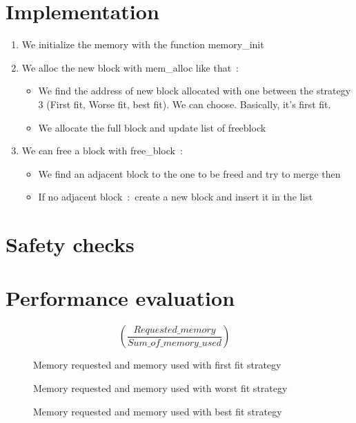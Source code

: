 \documentclass[a4paper,10pt]{article}
\begin{document}
\section{Implementation}	
\begin{enumerate}
\item We initialize the memory with the function memory\_init
\item We alloc the new block with mem\_alloc like that~:
	\begin{itemize}
	\item We find the address of new block allocated with one between
	 the strategy 3
	(First fit, Worse fit, best fit). We can choose. Basically, it's first fit.
	\item We allocate the full block and update list of freeblock
	\end{itemize}
\item We can free a block with free\_block~:
	\begin{itemize}
	\item We find an adjacent block to the one to be freed and try to merge then
	\item If no adjacent block~:~create a new block and insert it in the list
	\end{itemize}
\end{enumerate}
 
\section{Safety checks}

\section{Performance evaluation}

\begin{equation}
\left(\frac{Requested\_memory}{Sum\_of\_memory\_used} \right)  \quad
\end{equation}

\begin{figure}[ht]
\center 
\caption{Memory requested and memory used with first fit strategy}
\label{first}
\end{figure}
\begin{figure}[ht]
\center 
\caption{Memory requested and memory used with worst fit strategy}
\label{worst}
\end{figure}
\begin{figure}[ht]
\center 
\caption{Memory requested and memory used with best fit strategy}
\label{best}
\end{figure}
\end{document}
